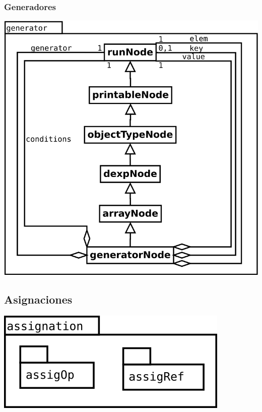 \subsubsection {Generadores}
\begin{center}
\includegraphics[scale=0.4]{generator.png} \\
\end{center}
\pagebreak
\subsection {Asignaciones}
\begin{center}
\includegraphics[scale=0.4]{assig-package.png} \\
\end{center}

